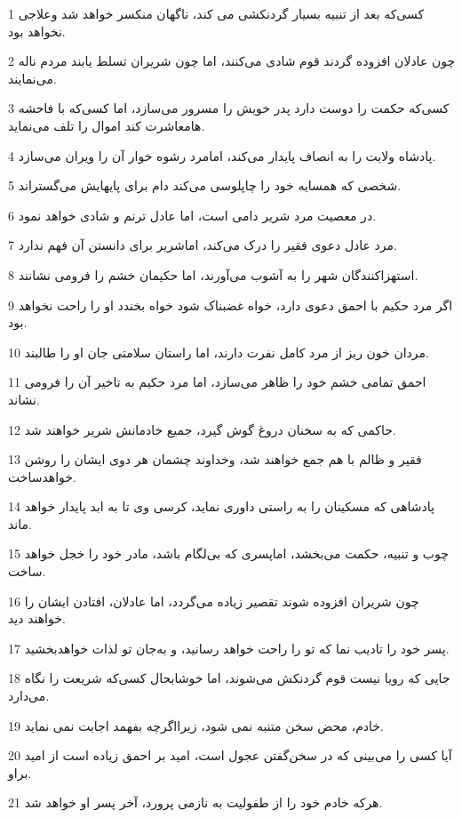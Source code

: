 \par 1 کسی‌که بعد از تنبیه بسیار گردنکشی می کند، ناگهان منکسر خواهد شد وعلاجی نخواهد بود.
\par 2 چون عادلان افزوده گردند قوم شادی می‌کنند، اما چون شریران تسلط یابند مردم ناله می‌نمایند.
\par 3 کسی‌که حکمت را دوست دارد پدر خویش را مسرور می‌سازد، اما کسی‌که با فاحشه هامعاشرت کند اموال را تلف می‌نماید.
\par 4 پادشاه ولایت را به انصاف پایدار می‌کند، امامرد رشوه خوار آن را ویران می‌سازد.
\par 5 شخصی که همسایه خود را چاپلوسی می‌کند دام برای پایهایش می‌گستراند.
\par 6 در معصیت مرد شریر دامی است، اما عادل ترنم و شادی خواهد نمود.
\par 7 مرد عادل دعوی فقیر را درک می‌کند، اماشریر برای دانستن آن فهم ندارد.
\par 8 استهزاکنندگان شهر را به آشوب می‌آورند، اما حکیمان خشم را فرومی نشانند.
\par 9 اگر مرد حکیم با احمق دعوی دارد، خواه غضبناک شود خواه بخندد او را راحت نخواهد بود.
\par 10 مردان خون ریز از مرد کامل نفرت دارند، اما راستان سلامتی جان او را طالبند.
\par 11 احمق تمامی خشم خود را ظاهر می‌سازد، اما مرد حکیم به تاخیر آن را فرومی نشاند.
\par 12 حاکمی که به سخنان دروغ گوش گیرد، جمیع خادمانش شریر خواهند شد.
\par 13 فقیر و ظالم با هم جمع خواهند شد، وخداوند چشمان هر دوی ایشان را روشن خواهدساخت.
\par 14 پادشاهی که مسکینان را به راستی داوری نماید، کرسی وی تا به ابد پایدار خواهد ماند.
\par 15 چوب و تنبیه، حکمت می‌بخشد، اماپسری که بی‌لگام باشد، مادر خود را خجل خواهد ساخت.
\par 16 چون شریران افزوده شوند تقصیر زیاده می‌گردد، اما عادلان، افتادن ایشان را خواهند دید.
\par 17 پسر خود را تادیب نما که تو را راحت خواهد رسانید، و به‌جان تو لذات خواهدبخشید.
\par 18 جایی که رویا نیست قوم گردنکش می‌شوند، اما خوشابحال کسی‌که شریعت را نگاه می‌دارد. 
\par 19 خادم، محض سخن متنبه نمی شود، زیرااگر‌چه بفهمد اجابت نمی نماید.
\par 20 آیا کسی را می‌بینی که در سخن‌گفتن عجول است، امید بر احمق زیاده است از امید براو.
\par 21 هر‌که خادم خود را از طفولیت به نازمی پرورد، آخر پسر او خواهد شد.
